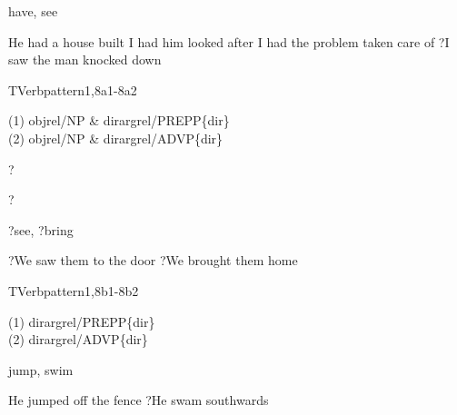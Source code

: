 
\begin{thetadescr}
\evitem  have, see
\esitem
     \begin{examples}
        \example  He had a house built
        \example  I had him looked after
        \example  I had the problem taken care of
        \example  ?I saw the man knocked down
     \end{examples}
\end{thetadescr}


\newpage
\verbpattern{[synDIRCLOSEDPREPPPROP] }
\begin{vpattern}
 TVerbpattern1,8a1-8a2
\csritem \mbox{}\\
     \begin{csr}
      (1) objrel/NP & dirargrel/PREPP\{dir\}\\
      (2) objrel/NP & dirargrel/ADVP\{dir\}
     \end{csr}
\remarksitem
\end{vpattern}


\begin{thetadescr}
\evitem ?
\esitem
     \begin{examples}
        \example  ?
     \end{examples}
\end{thetadescr}



\begin{thetadescr}
\evitem ?see, ?bring
\esitem
     \begin{examples}
        \example ?We saw them to the door
        \example ?We brought them home
     \end{examples}
\end{thetadescr}


\newpage
\verbpattern{[synDIROPENPREPPPROP]}
\begin{vpattern}
 TVerbpattern1,8b1-8b2
\csritem \mbox{}\\
     \begin{csr}
     (1) dirargrel/PREPP\{dir\}\\
     (2) dirargrel/ADVP\{dir\}
     \end{csr}
\remarksitem
\end{vpattern}


\begin{thetadescr}
\evitem  jump, swim
\esitem
     \begin{examples}
        \example  He jumped off the fence
        \example  ?He swam southwards
     \end{examples}
\end{thetadescr}


